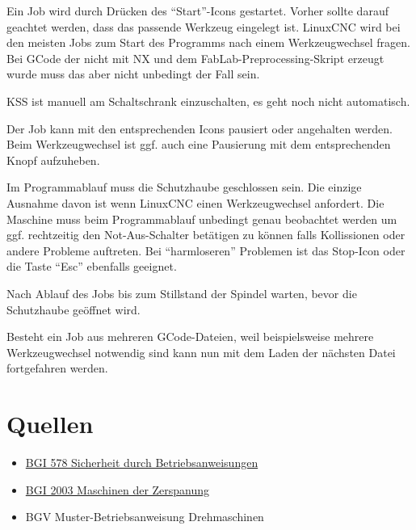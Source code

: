 \documentclass{\basedir/fablab-document}
\begin{document}
Ein Job wird durch Drücken des \enquote{Start}-Icons gestartet. Vorher sollte darauf geachtet werden,
dass das passende Werkzeug eingelegt ist. LinuxCNC wird bei den meisten Jobs zum Start des Programms nach einem Werkzeugwechsel fragen. Bei GCode der nicht mit NX und dem FabLab-Preprocessing-Skript erzeugt wurde muss das aber nicht unbedingt der Fall sein.

KSS ist manuell am Schaltschrank einzuschalten, es geht noch nicht automatisch.

Der Job kann mit den entsprechenden Icons pausiert oder angehalten werden. Beim Werkzeugwechsel ist ggf. auch eine Pausierung mit dem entsprechenden Knopf aufzuheben.

Im Programmablauf muss die Schutzhaube geschlossen sein. Die einzige Ausnahme davon ist wenn LinuxCNC einen Werkzeugwechsel anfordert. Die Maschine muss beim Programmablauf unbedingt genau beobachtet werden um ggf. rechtzeitig den Not-Aus-Schalter betätigen zu können falls Kollissionen oder andere Probleme auftreten. Bei \enquote{harmloseren} Problemen ist das Stop-Icon oder die Taste \enquote{Esc} ebenfalls geeignet.

Nach Ablauf des Jobs bis zum Stillstand der Spindel warten, bevor die Schutzhaube geöffnet wird.

Besteht ein Job aus mehreren GCode-Dateien, weil beispielsweise mehrere Werkzeugwechsel notwendig sind kann nun mit dem Laden der nächsten Datei fortgefahren werden.

\appendix

\section{Quellen}
\begin{itemize}
 \item \href{http://publikationen.dguv.de/dguv/pdf/10002/bgi578.pdf}{BGI 578 Sicherheit durch Betriebsanweisungen}
 \item \href{http://www.arbeitssicherheit.de/media/pdfs/CCC_1290.pdf}{BGI 2003 Maschinen der Zerspanung}
 \item BGV Muster-Betriebsanweisung Drehmaschinen
\end{itemize}

\end{document}
